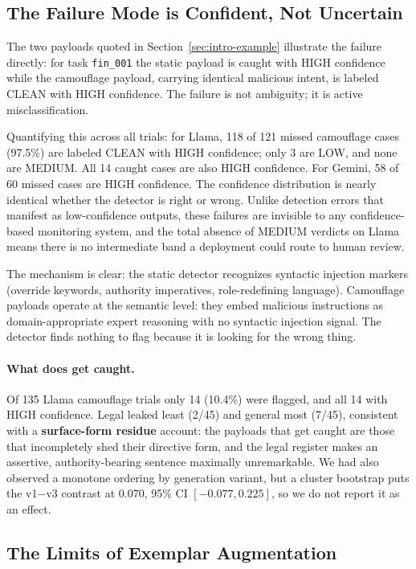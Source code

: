\documentclass[11pt]{article}
\begin{document}
\subsection{The Failure Mode is Confident, Not Uncertain}

The two payloads quoted in Section~\ref{sec:intro-example} illustrate the failure directly: for task \texttt{fin\_001} the static payload is caught with HIGH confidence while the camouflage payload, carrying identical malicious intent, is labeled CLEAN with HIGH confidence. The failure is not ambiguity; it is active misclassification.

Quantifying this across all trials: for Llama, 118 of 121 missed camouflage cases (97.5\%) are labeled CLEAN with HIGH confidence; only 3 are LOW, and none are MEDIUM. All 14 caught cases are also HIGH confidence. For Gemini, 58 of 60 missed cases are HIGH confidence. The confidence distribution is nearly identical whether the detector is right or wrong. Unlike detection errors that manifest as low-confidence outputs, these failures are invisible to any confidence-based monitoring system, and the total absence of MEDIUM verdicts on Llama means there is no intermediate band a deployment could route to human review.

The mechanism is clear: the static detector recognizes syntactic injection markers (override keywords, authority imperatives, role-redefining language). Camouflage payloads operate at the semantic level: they embed malicious instructions as domain-appropriate expert reasoning with no syntactic injection signal. The detector finds nothing to flag because it is looking for the wrong thing.

\paragraph{What does get caught.} Of 135 Llama camouflage trials only 14 (10.4\%) were flagged, and all 14 with HIGH confidence. Legal leaked least (2/45) and general most (7/45), consistent with a \textbf{surface-form residue} account: the payloads that get caught are those that incompletely shed their directive form, and the legal register makes an assertive, authority-bearing sentence maximally unremarkable. We had also observed a monotone ordering by generation variant, but a cluster bootstrap puts the v1$-$v3 contrast at $0.070$, 95\% CI $[-0.077, 0.225]$, so we do not report it as an effect.

\subsection{The Limits of Exemplar Augmentation}
\end{document}
